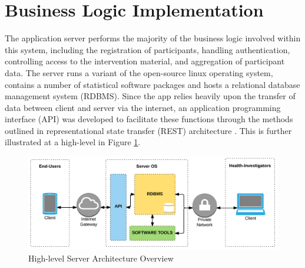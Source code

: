 \section{Business Logic Implementation}
The application server performs the majority of the business logic involved within this system, including the registration of participants, handling authentication, controlling access to the intervention material, and aggregation of participant data. The server runs a variant of the open-source linux operating system, contains a number of statistical software packages and hosts a relational database management system (RDBMS). Since the app relies heavily upon the transfer of data between client and server via the internet, an application programming interface (API) was developed to facilitate these functions through the methods outlined in representational state transfer (REST) architecture \cite{Fielding2000, Benslimane2008}. This is further illustrated at a high-level in Figure \ref{fig: clientserver-model-detail}.

\begin{figure}[h]
    \centering
    \includegraphics[scale=0.9, angle=0]{Files/prevention-study-1/figures/client-server-adapted}
    \caption{High-level Server Architecture Overview}
    \label{fig: clientserver-model-detail}
\end{figure}

